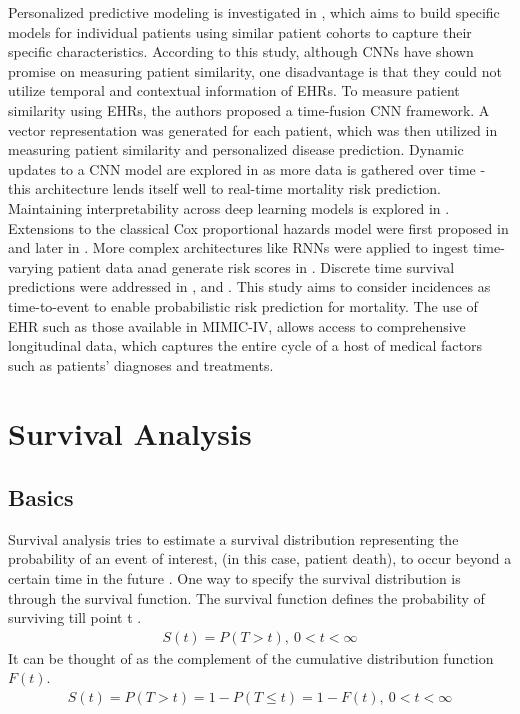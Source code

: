 \documentclass[%
 twocolumn,
 reprint,
 amsmath,amssymb,
 aps,nofootinbib
]{revtex4-2}
\begin{document}
Personalized predictive modeling is investigated in \cite{suo2017personalized}, which aims to build specific models for individual patients using similar patient cohorts to capture their specific characteristics. According to this study, although CNNs have shown promise on measuring patient similarity, one disadvantage is that they could not utilize temporal and contextual information of EHRs. To measure patient similarity using EHRs, the authors proposed a time-fusion CNN framework. A vector representation was generated for each patient, which was then utilized in measuring patient similarity and personalized disease prediction. Dynamic updates to a CNN model are explored in \cite{brand2018real} as more data is gathered over time - this architecture lends itself well to real-time mortality risk prediction. Maintaining interpretability across deep learning models is explored in \cite{caicedo2019iseeu}.\\

Extensions to the classical Cox proportional hazards model were first proposed in \cite{faraggi_simons} and later in \cite{deepsurv}. More complex architectures like RNNs were applied to ingest time-varying patient data anad generate risk scores in \cite{rnn_surv}. Discrete time survival predictions were addressed in \cite{kvamme_tte}, \cite{nagpal_deep_2021} and \cite{deephit}. This study aims to consider incidences as time-to-event to enable  probabilistic risk prediction for mortality. The use of EHR such as those available in MIMIC-IV, allows access to comprehensive longitudinal data, which captures the entire cycle of a host of medical factors such as patients' diagnoses and treatments.

\section{\label{surv}Survival Analysis}
\subsection{\label{surv_basics}Basics}
Survival analysis tries to estimate a survival distribution representing the probability of an event of interest, (in this case, patient death), to occur beyond a certain time in the future \cite{nagpal_deep_2021}. One way to specify the survival distribution is through the survival function. The survival function defines the probability of surviving till point t \cite{Moore_2016}.
\begin{align}
S(t) = P(T>t), \ 0 < t <  \infty \label{eq:surv}
\end{align}
It can be thought of as the complement of the cumulative distribution function $F(t)$.
\begin{align}
S(t) = P(T>t) = 1 - P(T\le t) = 1 - F(t), \ 0 < t <  \infty \label{eq:inv_cum_dist}
\end{align}
\end{document}
